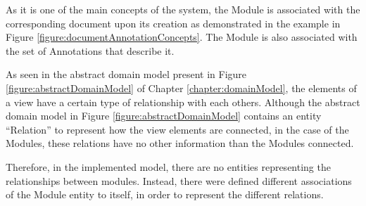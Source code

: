 As it is one of the main concepts of the system, the Module is associated with the corresponding document upon its creation as demonstrated in the example in Figure \ref{figure:documentAnnotationConcepts}. The Module is also associated with the set of Annotations that describe it.

As seen in the abstract domain model present in Figure \ref{figure:abstractDomainModel} of Chapter \ref{chapter:domainModel}, the elements of a view have a certain type of relationship with each others. Although the abstract domain model in Figure \ref{figure:abstractDomainModel} contains an entity ``Relation'' to represent how the view elements are connected, in the case of the Modules, these relations have no other information than the Modules connected. 

Therefore, in the implemented model, there are no entities representing the relationships between modules. Instead, there were defined different associations of the Module entity to itself, in order to represent the different relations.

